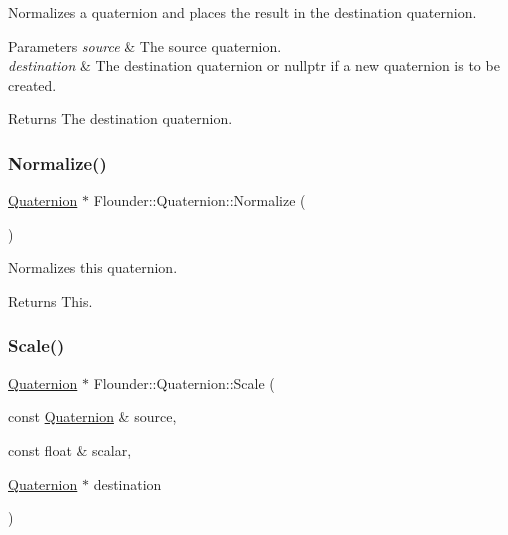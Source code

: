 Normalizes a quaternion and places the result in the destination quaternion. 


\begin{DoxyParams}{Parameters}
{\em source} & The source quaternion. \\
\hline
{\em destination} & The destination quaternion or nullptr if a new quaternion is to be created.\\
\hline
\end{DoxyParams}
\begin{DoxyReturn}{Returns}
The destination quaternion. 
\end{DoxyReturn}
\mbox{\label{class_flounder_1_1_quaternion_a4e6c3b7db519156a7ded03a02d943a59}} 
\subsubsection{\texorpdfstring{Normalize()}{Normalize()}\hspace{0.1cm}{\footnotesize\ttfamily [2/2]}}
{\footnotesize\ttfamily \hyperlink{class_flounder_1_1_quaternion}{Quaternion} $\ast$ Flounder\+::\+Quaternion\+::\+Normalize (\begin{DoxyParamCaption}{ }\end{DoxyParamCaption})}



Normalizes this quaternion. 

\begin{DoxyReturn}{Returns}
This. 
\end{DoxyReturn}
\mbox{\label{class_flounder_1_1_quaternion_ac29cb2a206cd19d1bd96a473aa0374a8}} 
\subsubsection{\texorpdfstring{Scale()}{Scale()}\hspace{0.1cm}{\footnotesize\ttfamily [1/2]}}
{\footnotesize\ttfamily \hyperlink{class_flounder_1_1_quaternion}{Quaternion} $\ast$ Flounder\+::\+Quaternion\+::\+Scale (\begin{DoxyParamCaption}\item[{const \hyperlink{class_flounder_1_1_quaternion}{Quaternion} \&}]{source,  }\item[{const float \&}]{scalar,  }\item[{\hyperlink{class_flounder_1_1_quaternion}{Quaternion} $\ast$}]{destination }\end{DoxyParamCaption})\hspace{0.3cm}{\ttfamily [static]}}




